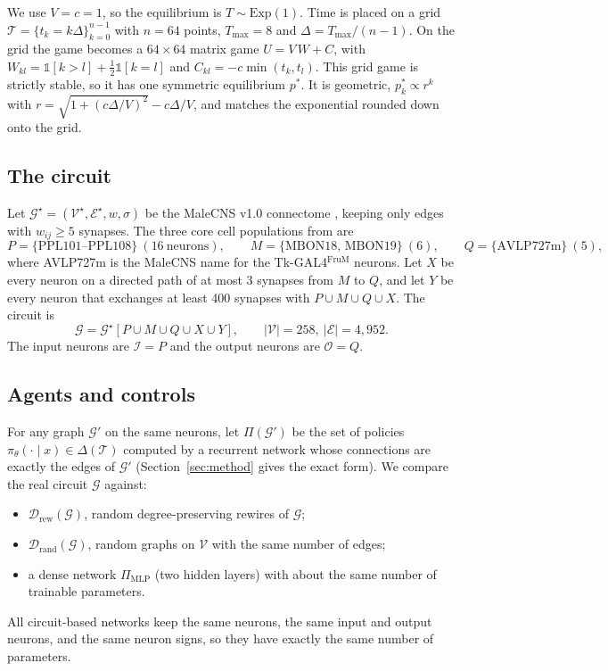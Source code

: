\documentclass{article}
\newcommand{\T}{\mathcal{T}}
\newcommand{\G}{\mathcal{G}}
\newcommand{\Vset}{\mathcal{V}}
\newcommand{\Eset}{\mathcal{E}}
\newcommand{\In}{\mathcal{I}}
\newcommand{\Out}{\mathcal{O}}
\begin{document}
We use $V = c = 1$, so the equilibrium is $T \sim \mathrm{Exp}(1)$. Time is placed on a grid $\T = \{t_k = k\Delta\}_{k=0}^{n-1}$ with $n = 64$ points, $T_{\max} = 8$ and $\Delta = T_{\max}/(n-1)$. On the grid the game becomes a $64 \times 64$ matrix game $U = V\,W + C$, with $W_{kl} = \mathbb 1[k>l] + \tfrac12 \mathbb 1[k=l]$ and $C_{kl} = -c\min(t_k,t_l)$. This grid game is strictly stable, so it has one symmetric equilibrium $p^*$. It is geometric, $p^*_k \propto r^k$ with $r = \sqrt{1+(c\Delta/V)^2} - c\Delta/V$, and matches the exponential rounded down onto the grid.

\subsection{The circuit}

Let $\G^\star = (\Vset^\star, \Eset^\star, w, \sigma)$ be the MaleCNS v1.0 connectome \citep{berg2026}, keeping only edges with $w_{ij} \ge 5$ synapses. The three core cell populations from \citet{ventimiglia2026} are
\[
P = \{\text{PPL101--PPL108}\}\ (16\ \text{neurons}),\qquad
M = \{\text{MBON18, MBON19}\}\ (6),\qquad
Q = \{\text{AVLP727m}\}\ (5),
\]
where AVLP727m is the MaleCNS name for the Tk-GAL4$^{\mathrm{FruM}}$ neurons. Let $X$ be every neuron on a directed path of at most 3 synapses from $M$ to $Q$, and let $Y$ be every neuron that exchanges at least 400 synapses with $P \cup M \cup Q \cup X$. The circuit is
\[
\G = \G^\star[P \cup M \cup Q \cup X \cup Y], \qquad |\Vset| = 258,\ |\Eset| = 4{,}952.
\]
The input neurons are $\In = P$ and the output neurons are $\Out = Q$.

\subsection{Agents and controls}

For any graph $\G'$ on the same neurons, let $\Pi(\G')$ be the set of policies $\pi_\theta(\cdot \mid x) \in \Delta(\T)$ computed by a recurrent network whose connections are exactly the edges of $\G'$ (Section~\ref{sec:method} gives the exact form). We compare the real circuit $\G$ against:
\begin{itemize}
  \item $\mathcal D_{\mathrm{rew}}(\G)$, random degree-preserving rewires of $\G$;
  \item $\mathcal D_{\mathrm{rand}}(\G)$, random graphs on $\Vset$ with the same number of edges;
  \item a dense network $\Pi_{\mathrm{MLP}}$ (two hidden layers) with about the same number of trainable parameters.
\end{itemize}
All circuit-based networks keep the same neurons, the same input and output neurons, and the same neuron signs, so they have exactly the same number of parameters.
\end{document}
